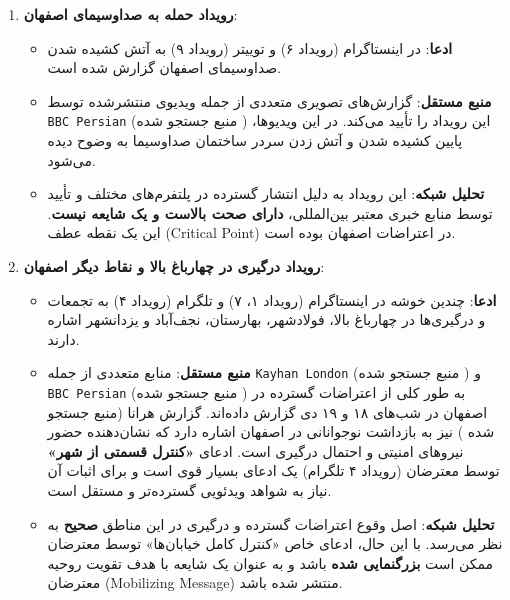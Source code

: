 \documentclass{article}
\begin{document}
	\begin{enumerate}
		\item \textbf{رویداد حمله به صداوسیمای اصفهان}:
		\begin{itemize}
			\item \textbf{ادعا}: در اینستاگرام (رویداد ۶) و توییتر (رویداد ۹) به آتش کشیده شدن صداوسیمای اصفهان گزارش شده است.
			\item \textbf{منبع مستقل}: گزارش‌های تصویری متعددی از جمله ویدیوی منتشرشده توسط \texttt{BBC Persian} (منبع جستجو شده \cite{bbc_isfahan_attack}) این رویداد را تأیید می‌کند. در این ویدیوها، پایین کشیده شدن و آتش زدن سردر ساختمان صداوسیما به وضوح دیده می‌شود.
			\item \textbf{تحلیل شبکه}: این رویداد به دلیل انتشار گسترده در پلتفرم‌های مختلف و تأیید توسط منابع خبری معتبر بین‌المللی، \textbf{دارای صحت بالاست و یک شایعه نیست}. این یک نقطه عطف (Critical Point) در اعتراضات اصفهان بوده است.
		\end{itemize}
		
		\item \textbf{رویداد درگیری در چهارباغ بالا و نقاط دیگر اصفهان}:
		\begin{itemize}
			\item \textbf{ادعا}: چندین خوشه در اینستاگرام (رویداد ۱، ۷) و تلگرام (رویداد ۴) به تجمعات و درگیری‌ها در چهارباغ بالا، فولادشهر، بهارستان، نجف‌آباد و یزدانشهر اشاره دارند.
			\item \textbf{منبع مستقل}: منابع متعددی از جمله \texttt{Kayhan London} (منبع جستجو شده \cite{kayhan_london}) و \texttt{BBC Persian} (منبع جستجو شده \cite{bbc_18_dey_report}) به طور کلی از اعتراضات گسترده در اصفهان در شب‌های ۱۸ و ۱۹ دی گزارش داده‌اند. گزارش هرانا (منبع جستجو شده \cite{hrana_arrests}) نیز به بازداشت نوجوانانی در اصفهان اشاره دارد که نشان‌دهنده حضور نیروهای امنیتی و احتمال درگیری است. ادعای \textbf{«کنترل قسمتی از شهر»} توسط معترضان (رویداد ۴ تلگرام) یک ادعای بسیار قوی است و برای اثبات آن نیاز به شواهد ویدئویی گسترده‌تر و مستقل است.
			\item \textbf{تحلیل شبکه}: اصل وقوع اعتراضات گسترده و درگیری در این مناطق \textbf{صحیح} به نظر می‌رسد. با این حال، ادعای خاص «کنترل کامل خیابان‌ها» توسط معترضان ممکن است \textbf{بزرگنمایی شده} باشد و به عنوان یک شایعه با هدف تقویت روحیه معترضان (Mobilizing Message) منتشر شده باشد.
		\end{itemize}
		

\end{enumerate}
\end{document}
